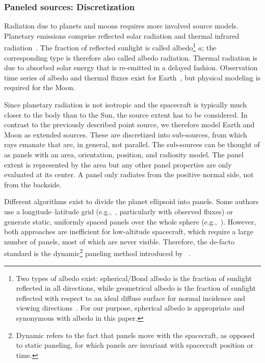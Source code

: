 \subsubsection{Paneled sources: Discretization}
Radiation due to planets and moons requires more involved source models. Planetary emissions comprise reflected solar radiation and thermal infrared radiation~\cite{Knocke1988}. The fraction of reflected sunlight is called albedo\footnote{Two types of albedo exist: spherical/Bond albedo is the fraction of sunlight reflected in all directions, while geometrical albedo is the fraction of sunlight reflected with respect to an ideal diffuse surface for normal incidence and viewing directions~\cite{Heiken1991}. For our purpose, spherical albedo is appropriate and synonymous with albedo in this paper.} $a$; the corresponding type is therefore also called albedo radiation. Thermal radiation is due to absorbed solar energy that is re-emitted in a delayed fashion. Observation time series of albedo and thermal fluxes exist for Earth~\cite{Dewitte2017}, but physical modeling is required for the Moon.

Since planetary radiation is not isotropic and the spacecraft is typically much closer to the body than to the Sun, the source extent has to be considered. In contrast to the previously described point source, we therefore model Earth and Moon as extended sources. These are discretized into sub-sources, from which rays emanate that are, in general, not parallel. The sub-sources can be thought of as panels with an area, orientation, position, and radiosity model. The panel extent is represented by the area but any other panel properties are only evaluated at its center. A panel only radiates from the positive normal side, not from the backside.

Different algorithms exist to divide the planet ellipsoid into panels. Some authors use a longitude--latitude grid (e.g.,~\cite{RodriguezSolano2011a,Woeske2019}, particularly with observed fluxes) or generate static, uniformly spaced panels over the whole sphere (e.g.,~\cite{Wetterer2014}). However, both approaches are inefficient for low-altitude spacecraft, which require a large number of panels, most of which are never visible. Therefore, the de-facto standard is the dynamic\footnote{Dynamic refers to the fact that panels move with the spacecraft, as opposed to static paneling, for which panels are invariant with spacecraft position or time.} paneling method introduced by \citeauthor{Knocke1988}~\cite{Knocke1988}.

